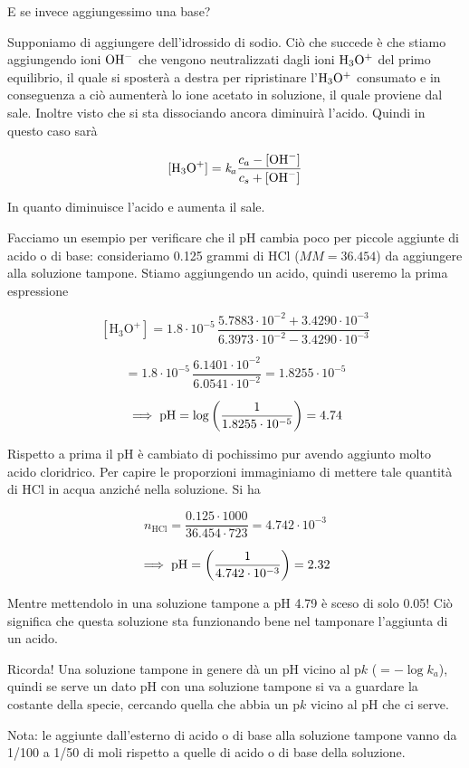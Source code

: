 E se invece aggiungessimo una base?

Supponiamo di aggiungere dell'idrossido di sodio. Ciò che succede è che stiamo aggiungendo ioni $\rm OH^-$ che vengono neutralizzati dagli ioni $\rm H_3O^+$ del primo equilibrio, il quale si sposterà a destra per ripristinare l'$\rm H_3O^+$ consumato e in conseguenza a ciò aumenterà lo ione acetato in soluzione, il quale proviene dal sale. Inoltre visto che si sta dissociando ancora diminuirà l'acido. Quindi in questo caso sarà

$${[\text{H}_3\text{O}^+]}=\textit{k}_a \frac{c_a - {[\text{OH}^-]}}{c_s + \rm{[\text{OH}^-]}}$$

In quanto diminuisce l'acido e aumenta il sale.

Facciamo un esempio per verificare che il pH cambia poco per piccole aggiunte di acido o di base: consideriamo 0.125 grammi di HCl ($MM=36.454$) da aggiungere alla soluzione tampone. Stiamo aggiungendo un acido, quindi useremo la prima espressione

$${[\text{H}_3\text{O}^+]}=1.8 \cdot 10^{-5}\,\frac{5.7883 \cdot 10^{-2} + 3.4290\cdot 10^{-3}}{6.3973 \cdot 10^{-2} - 3.4290 \cdot 10^{-3}}$$

$$=1.8 \cdot 10^{-5}\,\frac{6.1401 \cdot 10^{-2}}{6.0541 \cdot 10^{-2}}
=1.8255 \cdot 10^{-5}$$

$$\implies \rm pH=\log \left( \frac{1}{1.8255 \cdot 10^{-5}} \right)=4.74$$

Rispetto a prima il pH è cambiato di pochissimo pur avendo aggiunto molto acido cloridrico. Per capire le proporzioni immaginiamo di mettere tale quantità di HCl in acqua anziché nella soluzione. Si ha 

$$n_{\text{HCl}}=\frac{0.125 \cdot 1000}{36.454 \cdot 723}
=4.742 \cdot 10^{-3}$$

$$\implies \rm pH=\left( \frac{1}{4.742 \cdot 10^{-3}} \right)=2.32$$

Mentre mettendolo in una soluzione tampone a pH 4.79 è sceso di solo 0.05! Ciò significa che questa soluzione sta funzionando bene nel tamponare l'aggiunta di un acido.

\vspace{0.2cm}Ricorda! Una soluzione tampone in genere dà un pH vicino al p$k$ ($=-\log{k_a}$), quindi se serve un dato pH con una soluzione tampone si va a guardare la costante della specie, cercando quella che abbia un p$k$ vicino al pH che ci serve.

Nota: le aggiunte dall'esterno di acido o di base alla soluzione tampone vanno da 1/100 a 1/50 di moli rispetto a quelle di acido o di base della soluzione.

